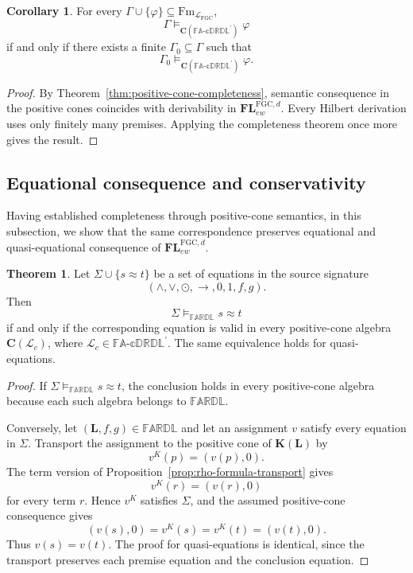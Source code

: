 \documentclass[final,12pt,times]{elsarticle}
\theoremstyle{plain}
\theoremstyle{definition}
\newtheorem{theorem}[definition]{Theorem}
\newtheorem{corollary}[definition]{Corollary}
\theoremstyle{break}
\newcommand{\FARDL}{\mathbb{FARDL}}
\newcommand{\CFADp}{\mathbb{FA\text{-}cDRDL}^{\prime}}
\newcommand{\Cfun}{\mathbf C}
\begin{document}
\begin{corollary}
\label{cor:positive-compactness}
For every \(\Gamma\cup\{\varphi\}\subseteq
\mathrm{Fm}_{\mathcal L_{\mathrm{FGC}}}\),
\[
 \Gamma\models_{\Cfun(\CFADp)}\varphi
\]
if and only if there exists a finite \(\Gamma_0\subseteq\Gamma\) such that
\[
 \Gamma_0\models_{\Cfun(\CFADp)}\varphi.
\]
\end{corollary}

\begin{proof}
By Theorem~\ref{thm:positive-cone-completeness}, semantic consequence in the
positive cones coincides with derivability in
\(\mathbf{FL}^{\mathrm{FGC},d}_{ew}\).  Every Hilbert derivation uses only
finitely many premises.  Applying the completeness theorem once more gives
the result.
\end{proof}


\subsection{Equational consequence and conservativity}
\label{subsec:equational-consequence}

Having established completeness through positive-cone semantics, in this subsection, we show that the same correspondence preserves equational and quasi-equational consequence of \(\mathbf{FL}^{\mathrm{FGC},d}_{ew}\).

\begin{theorem}
\label{thm:equational-transport}
Let \(\Sigma\cup\{s\approx t\}\) be a set of equations in the source
signature
\[
 (\wedge,\vee,\odot,\to,0,1,f,g).
\]
Then
\[
 \Sigma\models_{\FARDL}s\approx t
\]
if and only if the corresponding equation is valid in every positive-cone
algebra \(\Cfun(\mathcal{\mathscr L}_c)\), where
\(\mathcal{\mathscr L}_c\in\CFADp\).  The same equivalence holds for
quasi-equations.
\end{theorem}

\begin{proof}
If \(\Sigma\models_{\FARDL}s\approx t\), the conclusion holds in every
positive-cone algebra because each such algebra belongs to \(\FARDL\).

Conversely, let \((\mathbf L,f,g)\in\FARDL\) and let an assignment \(v\)
satisfy every equation in \(\Sigma\).  Transport the assignment to the
positive cone of \(\mathbf K(\mathbf{L})\) by
\[
 v^K(p)=(v(p),0).
\]
The term version of Proposition~\ref{prop:rho-formula-transport} gives
\[
 v^K(r)=(v(r),0)
\]
for every term \(r\).  Hence \(v^K\) satisfies \(\Sigma\), and the assumed
positive-cone consequence gives
\[
 (v(s),0)=v^K(s)=v^K(t)=(v(t),0).
\]
Thus \(v(s)=v(t)\).  The proof for quasi-equations is identical, since the
transport preserves each premise equation and the conclusion equation.
\end{proof}
\end{document}
